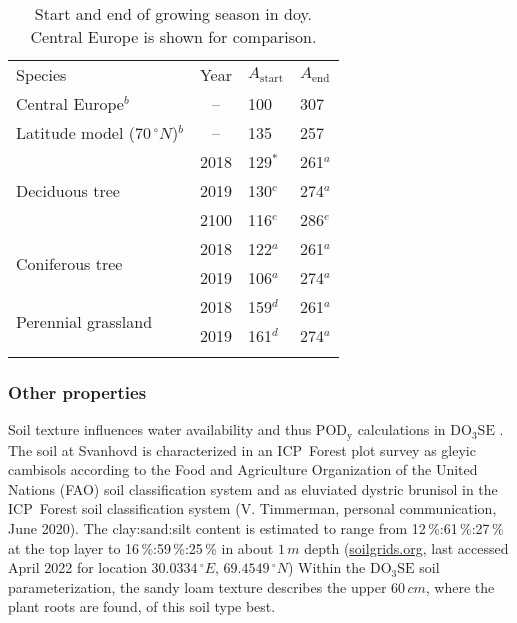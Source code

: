 \documentclass[bg, manuscript]{copernicus}
\begin{document}
\begin{table}[t]
  \caption{Start and end of growing season in \unit{doy}. Central Europe is shown for comparison.}
  \label{tab:sensitivity_tests_gs}
  \begin{tabular}{lcll}
    \tophline
    Species & Year & $A_\mathrm{start}$ & $A_\mathrm{end}$\\
    \middlehline
    Central Europe$^b$ & -- & 100 & 307\\
    Latitude model ($70\,\unit{^\circ N}$)$^b$ & -- & 135 & 257\\
    \multirow{3}{*}{Deciduous tree} & 2018 & 129$^*$ & 261$^a$ \\
    & 2019 & 130$^c$ & 274$^a$ \\
    & 2100 & 116$^e$ & 286$^e$ \\
    \multirow{2}{*}{Coniferous tree} & 2018 & 122$^a$ & 261$^a$ \\
    & 2019 & 106$^a$ & 274$^a$ \\
    \multirow{2}{*}{Perennial grassland} & 2018 & 159$^d$ & 261$^a$\\
    & 2019 & 161$^d$ & 274$^a$ \\
    \bottomhline
  \end{tabular}
\end{table}

\subsubsection{Other properties}
\label{subsec:soil}

Soil texture influences water availability and thus $\mathrm{POD_y}$ calculations in $\mathrm{DO_3SE}$ \citep{ACP:Bueker2012}. The soil at Svanhovd is characterized in an ICP~Forest plot survey as gleyic cambisols according to the Food and Agriculture Organization of the United Nations (FAO) soil classification system and as eluviated dystric brunisol in the ICP~Forest soil classification system (V. Timmerman, personal communication, June 2020). The clay:sand:silt content is estimated to range from 12\,\%:61\,\%:27\,\% at the top layer to 16\,\%:59\,\%:25\,\% in about $1\,\unit{m}$ depth (\href{https://soilgrids.org/}{soilgrids.org}, last accessed April 2022 for location $30.0334\,\unit{^\circ E}$, $69.4549\,\unit{^\circ N}$) Within the $\mathrm{DO_3SE}$ soil parameterization, the sandy loam texture describes the upper $60\,\unit{cm}$, where the plant roots are found, of this soil type best. 
\end{document}
